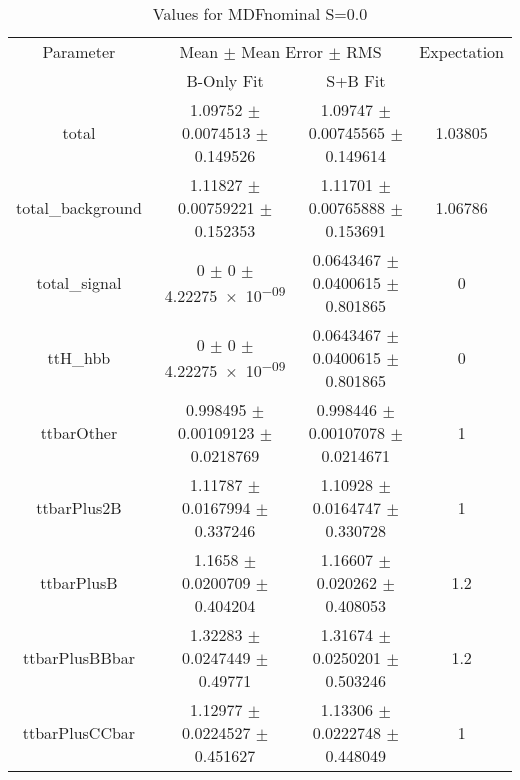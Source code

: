 \begin{table}
\centering
\caption{Values for MDFnominal S=0.0}
\begin{tabular}{cccc}
\toprule
Parameter & \multicolumn{2}{c}{Mean $\pm$ Mean Error $\pm$ RMS} & Expectation\\
 & B-Only Fit & S+B Fit & \\
\midrule
total & \num{1.09752} $\pm$ \num{0.0074513} $\pm$ \num{0.149526} & \num{1.09747} $\pm$ \num{0.00745565} $\pm$ \num{0.149614} & \num{1.03805}\\
total\_background & \num{1.11827} $\pm$ \num{0.00759221} $\pm$ \num{0.152353} & \num{1.11701} $\pm$ \num{0.00765888} $\pm$ \num{0.153691} & \num{1.06786}\\
total\_signal & \num{0} $\pm$ \num{0} $\pm$ \num{4.22275e-09} & \num{0.0643467} $\pm$ \num{0.0400615} $\pm$ \num{0.801865} & \num{0}\\
ttH\_hbb & \num{0} $\pm$ \num{0} $\pm$ \num{4.22275e-09} & \num{0.0643467} $\pm$ \num{0.0400615} $\pm$ \num{0.801865} & \num{0}\\
ttbarOther & \num{0.998495} $\pm$ \num{0.00109123} $\pm$ \num{0.0218769} & \num{0.998446} $\pm$ \num{0.00107078} $\pm$ \num{0.0214671} & \num{1}\\
ttbarPlus2B & \num{1.11787} $\pm$ \num{0.0167994} $\pm$ \num{0.337246} & \num{1.10928} $\pm$ \num{0.0164747} $\pm$ \num{0.330728} & \num{1}\\
ttbarPlusB & \num{1.1658} $\pm$ \num{0.0200709} $\pm$ \num{0.404204} & \num{1.16607} $\pm$ \num{0.020262} $\pm$ \num{0.408053} & \num{1.2}\\
ttbarPlusBBbar & \num{1.32283} $\pm$ \num{0.0247449} $\pm$ \num{0.49771} & \num{1.31674} $\pm$ \num{0.0250201} $\pm$ \num{0.503246} & \num{1.2}\\
ttbarPlusCCbar & \num{1.12977} $\pm$ \num{0.0224527} $\pm$ \num{0.451627} & \num{1.13306} $\pm$ \num{0.0222748} $\pm$ \num{0.448049} & \num{1}\\
\bottomrule
\end{tabular}
\end{table}